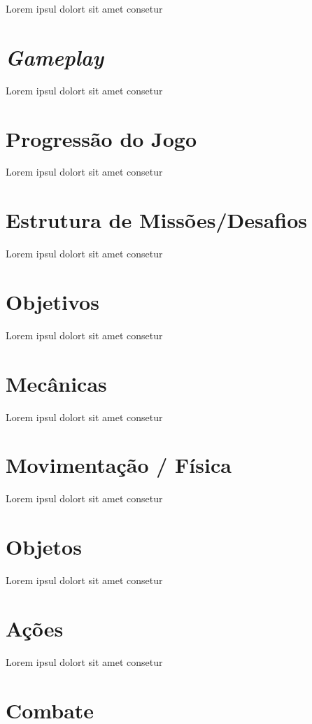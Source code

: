 Lorem ipsul dolort sit amet consetur

\section{\textit{Gameplay}}

Lorem ipsul dolort sit amet consetur

\section{Progressão do Jogo}

Lorem ipsul dolort sit amet consetur

\section{Estrutura de Missões/Desafios}

Lorem ipsul dolort sit amet consetur

\section{Objetivos}

Lorem ipsul dolort sit amet consetur

\section{Mecânicas}

Lorem ipsul dolort sit amet consetur

\section{Movimentação / Física}

Lorem ipsul dolort sit amet consetur

\section{Objetos}

Lorem ipsul dolort sit amet consetur

\section{Ações}

Lorem ipsul dolort sit amet consetur

\section{Combate}

